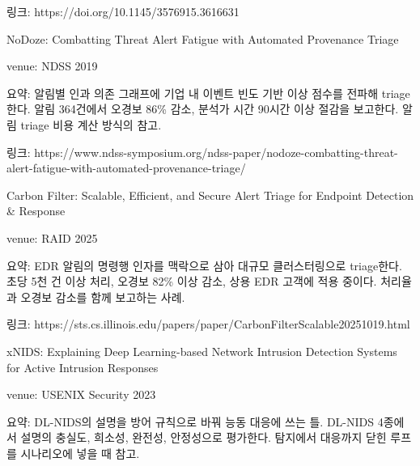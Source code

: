 \par\noindent \textbullet\enspace 링크: https:/\allowbreak{}/\allowbreak{}doi.org/\allowbreak{}10.1145/\allowbreak{}3576915.3616631


\par\noindent \textbullet\enspace NoDoze: Combatting Threat Alert Fatigue with Automated Provenance Triage


\par\noindent \textbullet\enspace venue: NDSS 2019


\par\noindent \textbullet\enspace 요약: 알림별 인과 의존 그래프에 기업 내 이벤트 빈도 기반 이상 점수를 전파해 triage한다. 알림 364건에서 오경보 86\% 감소, 분석가 시간 90시간 이상 절감을 보고한다. 알림 triage 비용 계산 방식의 참고.


\par\noindent \textbullet\enspace 링크: https:/\allowbreak{}/\allowbreak{}www.ndss-symposium.org/\allowbreak{}ndss-paper/\allowbreak{}nodoze-combatting-threat-alert-fatigue-with-automated-provenance-triage/\allowbreak{}


\par\noindent \textbullet\enspace Carbon Filter: Scalable, Efficient, and Secure Alert Triage for Endpoint Detection \& Response


\par\noindent \textbullet\enspace venue: RAID 2025


\par\noindent \textbullet\enspace 요약: EDR 알림의 명령행 인자를 맥락으로 삼아 대규모 클러스터링으로 triage한다. 초당 5천 건 이상 처리, 오경보 82\% 이상 감소, 상용 EDR 고객에 적용 중이다. 처리율과 오경보 감소를 함께 보고하는 사례.


\par\noindent \textbullet\enspace 링크: https:/\allowbreak{}/\allowbreak{}sts.cs.illinois.edu/\allowbreak{}papers/\allowbreak{}paper/\allowbreak{}CarbonFilterScalable20251019.html


\par\noindent \textbullet\enspace xNIDS: Explaining Deep Learning-based Network Intrusion Detection Systems for Active Intrusion Responses


\par\noindent \textbullet\enspace venue: USENIX Security 2023


\par\noindent \textbullet\enspace 요약: DL-NIDS의 설명을 방어 규칙으로 바꿔 능동 대응에 쓰는 틀. DL-NIDS 4종에서 설명의 충실도, 희소성, 완전성, 안정성으로 평가한다. 탐지에서 대응까지 닫힌 루프를 시나리오에 넣을 때 참고.


